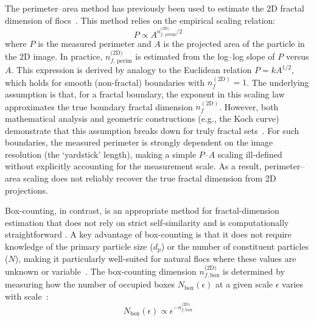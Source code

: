 \documentclass{agujournal2019}
\begin{document}
The perimeter--area method has previously been used to estimate the 2D fractal dimension of flocs~\cite{lee2004prediction, maggi2004method, tang2015reconstructing}. This method relies on the empirical scaling relation:
\begin{equation}
P \propto A^{n_{f,\,\text{perim}}^{\text{(2D)}} / 2}
\end{equation}
where $P$ is the measured perimeter and $A$ is the projected area of the particle in the 2D image. In practice, $n_{f,\,\text{perim}}^{\text{(2D)}}$ is estimated from the log--log slope of $P$ versus $A$. This expression is derived by analogy to the Euclidean relation $P = k A^{1/2}$, which holds for smooth (non-fractal) boundaries with $n_f^{(2\mathrm{D})} = 1$. The underlying assumption is that, for a fractal boundary, the exponent in this scaling law approximates the true boundary fractal dimension $n_f^{(2\mathrm{D})}$. However, both mathematical analysis and geometric constructions (e.g., the Koch curve) demonstrate that this assumption breaks down for truly fractal sets~\cite{cheng1995perimeter,frame_mandelbrot_neger_2025}. For such boundaries, the measured perimeter is strongly dependent on the image resolution (the `yardstick' length), making a simple $P$--$A$ scaling ill-defined without explicitly accounting for the measurement scale. As a result, perimeter--area scaling does not reliably recover the true fractal dimension from 2D projections.

Box-counting, in contrast, is an appropriate method for fractal-dimension estimation that does not rely on strict self-similarity and is computationally straightforward \cite{foroutan1999advances}. A key advantage of box-counting is that it does not require knowledge of the primary particle size ($d_p$) or the number of constituent particles ($N$), making it particularly well-suited for natural flocs where these values are unknown or variable~\cite{bellouti1997flocs, spencer2022quantification}. The box-counting dimension $n_{f,\text{box}}^{\text{(2D)}}$ is determined by measuring how the number of occupied boxes $N_{\text{box}}(\epsilon)$ at a given scale $\epsilon$ varies with scale~\cite{mandelbrot1967long}:
\begin{equation}
N_{\text{box}}(\epsilon) \propto \epsilon^{-n_{f,\text{box}}^{\text{(2D)}}}
\end{equation}
\end{document}
